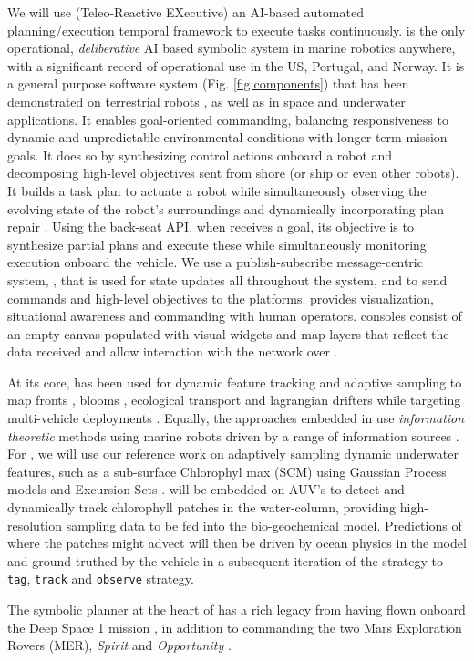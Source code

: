 We will use \rx (Teleo-Reactive EXecutive) an AI-based automated
planning/execution temporal framework to execute tasks
continuously. \rx is the only operational, \emph{deliberative} AI
based symbolic system in marine robotics anywhere, with a significant
record of operational use in the US, Portugal, and Norway. It is a
general purpose software system (Fig. \ref{fig:components}) that has
been demonstrated on terrestrial robots \cite{Meeussen10}, as well as
in space and underwater applications. It enables goal-oriented
commanding, balancing responsiveness to dynamic and unpredictable
environmental conditions with longer term mission goals. It does so by
synthesizing control actions onboard a robot and decomposing
high-level objectives sent from shore (or ship or even other
robots). It builds a task plan to actuate a robot while simultaneously
observing the evolving state of the robot's surroundings and
dynamically incorporating plan repair \cite{py10,rajan12,rajan12b}.
Using the back-seat API, when \rx receives a goal, its objective is to
synthesize partial plans and execute these while simultaneously
monitoring execution onboard the vehicle. We use a publish-subscribe
message-centric system, \imc \cite{imc2009}, that is used for state
updates all throughout the system, and to send commands and high-level
objectives to the platforms. \nep provides visualization, situational
awareness and commanding with human operators. \nep consoles consist
of an empty canvas populated with visual widgets and map layers that
reflect the data received and allow interaction with the network over
\imce.  

At its core, \rx has been used for dynamic feature tracking and
adaptive sampling to map fronts \cite{fronts11,smith14}, blooms
\cite{Das-2010-637}, ecological transport \cite{jdas12,jdas13} and
lagrangian drifters \cite{das10,das11a} while targeting multi-vehicle
deployments \cite{das11,Ferreira2018,pinto20}. Equally, the approaches
embedded in \rx use \emph{information theoretic} methods using marine
robots driven by a range of information sources
\cite{Das-2010-637,fronts11,olaya12,jdas12,jdas13,das15,fossum18,fossum19,fossum19b,fossum21}.
For \proj, we will use our reference work on adaptively sampling
dynamic underwater features, such as a sub-surface Chlorophyl max
(SCM) using Gaussian Process models \cite{fossum19} and Excursion Sets
\cite{fossum21}. \rx will be embedded on AUV's to detect and
dynamically track chlorophyll patches in the water-column, providing
high-resolution sampling data to be fed into the bio-geochemical
model. Predictions of where the patches might advect will then be
driven by ocean physics in the model and ground-truthed by the vehicle
in a subsequent iteration of the strategy to \texttt{tag},
\texttt{track} and \texttt{observe} strategy.  

The symbolic planner at the heart of \rx has a rich legacy from \nas
having flown onboard the Deep Space 1 mission
\cite{rajan00,jonsson00}, in addition to commanding the two Mars
Exploration Rovers (MER), \emph{Spirit} and \emph{Opportunity}
\cite{aichang04,bresina05}.



